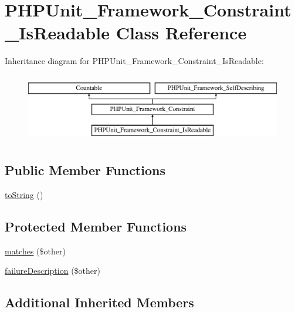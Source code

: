 \hypertarget{class_p_h_p_unit___framework___constraint___is_readable}{}\section{P\+H\+P\+Unit\+\_\+\+Framework\+\_\+\+Constraint\+\_\+\+Is\+Readable Class Reference}
\label{class_p_h_p_unit___framework___constraint___is_readable}
Inheritance diagram for P\+H\+P\+Unit\+\_\+\+Framework\+\_\+\+Constraint\+\_\+\+Is\+Readable\+:\begin{figure}[H]
\begin{center}
\leavevmode
\includegraphics[height=3.000000cm]{class_p_h_p_unit___framework___constraint___is_readable}
\end{center}
\end{figure}
\subsection*{Public Member Functions}
\begin{DoxyCompactItemize}
\item 
\mbox{\hyperlink{class_p_h_p_unit___framework___constraint___is_readable_a5558c5d549f41597377fa1ea8a1cefa3}{to\+String}} ()
\end{DoxyCompactItemize}
\subsection*{Protected Member Functions}
\begin{DoxyCompactItemize}
\item 
\mbox{\hyperlink{class_p_h_p_unit___framework___constraint___is_readable_a9c9c337de483bbdbb9fa249a6c7c9cc5}{matches}} (\$other)
\item 
\mbox{\hyperlink{class_p_h_p_unit___framework___constraint___is_readable_aaabb679273bfb812df4d81c283754a59}{failure\+Description}} (\$other)
\end{DoxyCompactItemize}
\subsection*{Additional Inherited Members}


